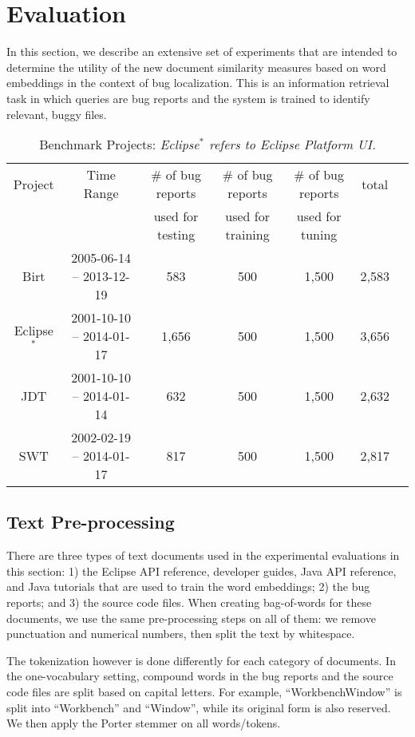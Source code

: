 \section{Evaluation}
\label{sec:evaluation}

In this section, we describe an extensive set of experiments that are intended to determine the utility of the new document similarity measures based on word embeddings in the context of bug localization. This is an information retrieval task in which queries are bug reports and the system is trained to identify relevant, buggy files.

\begin{table*}[!thbp]
\centering
\caption{Benchmark Projects: {\it Eclipse$^*$ refers to Eclipse Platform UI.}}
\begin{tabular}{|c|c|c|c|c|c|c|} \hline
Project&Time Range&\# of bug reports&\# of bug reports&\# of bug reports&total\\
&&used for testing&used for training&used for tuning&\\ \hline
Birt&2005-06-14 -- 2013-12-19&583&500&1,500&2,583\\ \hline
Eclipse$^*$ &2001-10-10 -- 2014-01-17&1,656&500&1,500&3,656\\ \hline
JDT&2001-10-10 -- 2014-01-14&632&500&1,500&2,632\\ \hline
SWT&2002-02-19 -- 2014-01-17&817&500&1,500&2,817\\ \hline
\end{tabular}
\label{tab:dataset}
\end{table*}

\subsection{Text Pre-processing}
\label{sec:tokenization}

There are three types of text documents used in the experimental evaluations in this section: 1) the Eclipse API reference, developer guides, Java API reference, and Java tutorials that are used to train the word embeddings; 2) the bug reports; and 3) the source code files. When creating bag-of-words for these documents, we use the same pre-processing steps on all of them: we remove punctuation and numerical numbers, then split the text by whitespace. 

The tokenization however is done differently for each category of documents. In the one-vocabulary setting, compound words in the bug reports and the source code files are split based on capital letters. For example, ``WorkbenchWindow'' is split into ``Workbench'' and ``Window'', while its original form is also reserved. We then apply the Porter stemmer on all words/tokens.

